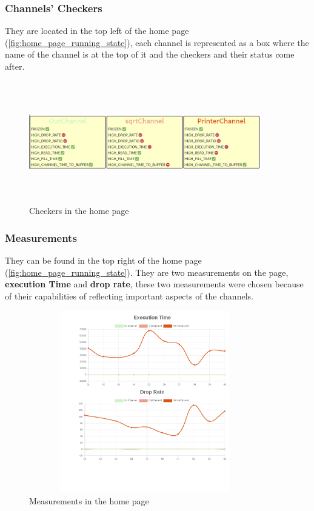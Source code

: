 \subsubsection{Channels' Checkers}
They are located in the top left of the home page (\ref{fig:home_page_running_state}), 
each channel is represented as a box where the name
of the channel is at the top of it and the checkers and their status come after. 
\newline
\begin{figure}[H]
	\centering
	\includegraphics[width=0.9\textwidth,height=200px]{images/checkers_home_page.png}
	\caption{Checkers in the home page}
	\label{fig:checkers_home_page}
\end{figure}

\subsubsection{Measurements}\label{sec:measuremets_home}
They can be found in the top right of the home page (\ref{fig:home_page_running_state}). They are
two measurements on the page, \textbf{execution Time} and \textbf{drop rate}, these two measurements
were chosen because of their capabilities of reflecting important aspects of the channels.
\newline
\begin{figure}[H]
	\centering
	\includegraphics[width=0.9\textwidth,height=300px]{images/measures_home_page.png}
	\caption{Measurements in the home page}
	\label{fig:measures_home_page}
\end{figure}


